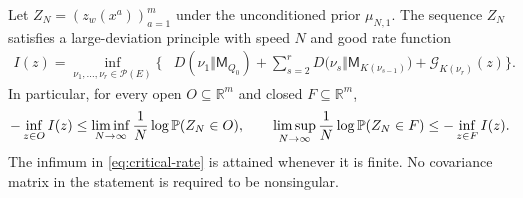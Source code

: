 \begin{theorem}
\label{thm:critical-ldp}
Let $Z_N=(z_w(x^a))_{a=1}^m$ under the unconditioned prior
$\mu_{N,1}$. The sequence $Z_N$ satisfies a large-deviation principle
with speed $N$ and good rate function
\begin{equation}\label{eq:critical-rate}
 \begin{split}
 I(z)=\inf_{\nu_1,\ldots,\nu_r\in\mathcal P(E)}
 \bigg\{&D(\nu_1\Vert\mathsf M_{Q_0})
  +\sum_{s=2}^{r}D\bigl(\nu_s\Vert\mathsf M_{K(\nu_{s-1})}\bigr)
  +\mathcal G_{K(\nu_r)}(z)\bigg\}.
 \end{split}
\end{equation}
In particular, for every open $O\subseteq\mathbb R^m$ and closed
$F\subseteq\mathbb R^m$,
\[
 -\inf_{z\in O}I(z)
 \leq\liminf_{N\to\infty}\frac1N\log\mathbb P(Z_N\in O),
 \qquad
 \limsup_{N\to\infty}\frac1N\log\mathbb P(Z_N\in F)
 \leq-\inf_{z\in F}I(z).
\]
The infimum in \eqref{eq:critical-rate} is attained whenever it is finite.
No covariance matrix in the statement is required to be nonsingular.
\end{theorem}

